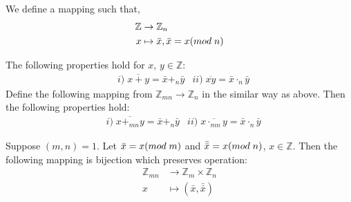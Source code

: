 \documentclass[10pt,a4paper]{article}
\begin{document}
\begin{definition}
We define a mapping such that,
\begin{align*}
\mathbb{Z}&\rightarrow\mathbb{Z}_n \\
x&\mapsto\bar{x},\bar{x}=x(mod\;n)
\end{align*}
\end{definition}

\begin{theorem}
The following properties hold for $x,\,y\in\mathbb{Z}$:
\begin{align*}
&i)\;\overline{x+y}=\bar{x}+_n\bar{y}
&ii)\;\overline{xy}=\bar{x}\cdot_n\bar{y}
\end{align*}
Define the following mapping from $\mathbb{Z}_{mn}\rightarrow\mathbb{Z}_n$ in the similar way as above. Then the following properties hold:
\begin{align*}
&i)\;\overline{x+_{mn}y}=\bar{x}+_n\bar{y}
&ii)\;\overline{x\cdot_{mn}y}=\bar{x}\cdot_n\bar{y}
\end{align*}
\end{theorem}

\begin{theorem}
Suppose $(m,n)=1$. Let $\bar{x}=x(mod\;m)$ and $\bar{\bar{x}}=x(mod\;n)$, $x\in\mathbb{Z}.$ Then the following mapping is bijection which preserves operation:
\begin{align*}
\mathbb{Z}_{mn} &\rightarrow\mathbb{Z}_m\times\mathbb{Z}_n \\
x&\mapsto(\bar{x},\bar{\bar{x}})
\end{align*}
\end{theorem}
\end{document}
